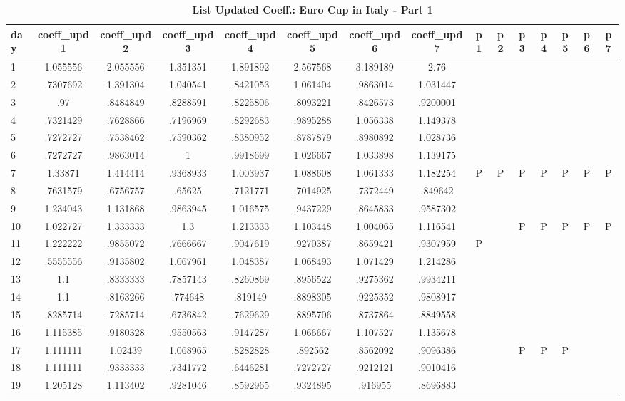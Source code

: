 \documentclass[a4paper,12pt]{article}
\begin{document}
\begin{landscape}
\begin{footnotesize}
\begin{center}
\begin{longtable}{lcccccccccccccc|}
\caption{\textbf{List Updated Coeff.: Euro Cup in Italy - Part 1}\label{tab_it_3a}}
\hline
day&coeff\_upd1&coeff\_upd2&coeff\_upd3&coeff\_upd4&coeff\_upd5&coeff\_upd6&coeff\_upd7&p1&p2&p3&p4&p5&p6&p7 \\ \hline
1&1.055556&2.055556&1.351351&1.891892&2.567568&3.189189&2.76&&&&&&& \\
2&.7307692&1.391304&1.040541&.8421053&1.061404&.9863014&1.031447&&&&&&& \\
3&.97&.8484849&.8288591&.8225806&.8093221&.8426573&.9200001&&&&&&& \\
4&.7321429&.7628866&.7196969&.8292683&.9895288&1.056338&1.149378&&&&&&& \\
5&.7272727&.7538462&.7590362&.8380952&.8787879&.8980892&1.028736&&&&&&& \\
6&.7272727&.9863014&1&.9918699&1.026667&1.033898&1.139175&&&&&&& \\
7&1.33871&1.414414&.9368933&1.003937&1.088608&1.061333&1.182254&P&P&P&P&P&P&P \\
8&.7631579&.6756757&.65625&.7121771&.7014925&.7372449&.849642&&&&&&& \\
9&1.234043&1.131868&.9863945&1.016575&.9437229&.8645833&.9587302&&&&&&& \\
10&1.022727&1.333333&1.3&1.213333&1.103448&1.004065&1.116541&&&P&P&P&P&P \\
11&1.222222&.9855072&.7666667&.9047619&.9270387&.8659421&.9307959&P&&&&&& \\
12&.5555556&.9135802&1.067961&1.048387&1.068493&1.071429&1.214286&&&&&&& \\
13&1.1&.8333333&.7857143&.8260869&.8956522&.9275362&.9934211&&&&&&& \\
14&1.1&.8163266&.774648&.819149&.8898305&.9225352&.9808917&&&&&&& \\
15&.8285714&.7285714&.6736842&.7629629&.8895706&.8737864&.8849558&&&&&&& \\
16&1.115385&.9180328&.9550563&.9147287&1.066667&1.107527&1.135678&&&&&&& \\
17&1.111111&1.02439&1.068965&.8282828&.892562&.8562092&.9096386&&&P&P&P&& \\
18&1.111111&.9333333&.7341772&.6446281&.7272727&.9212121&.9010416&&&&&&& \\
19&1.205128&1.113402&.9281046&.8592965&.9324895&.916955&.8696883&&&&&&& \\

\end{longtable}
\end{center}
\end{footnotesize}
\end{landscape}
\end{document}
